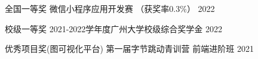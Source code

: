 

\begin{cvhonors}

    \cvhonor
    {全国一等奖} %
    {微信小程序应用开发赛 （获奖率0.3\%）} %
    {} %
    {2022} %

    \cvhonor
    {校级一等奖} %
    {2021-2022学年度广州大学校级综合奖学金} %
    {} %
    {2022} %

    \cvhonor
    {优秀项目奖(图可视化平台)} %
    {第一届字节跳动青训营 前端进阶班} %
    {} %
    {2021} %


\end{cvhonors}
